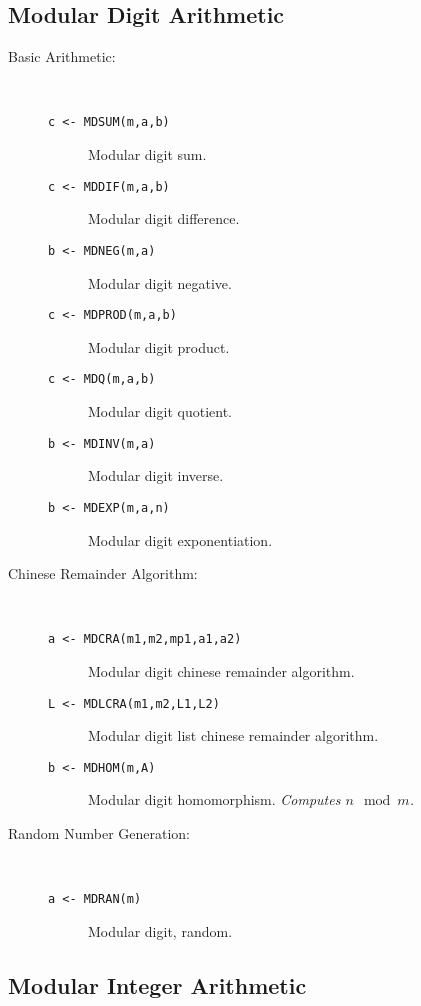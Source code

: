 \subsection{Modular Digit Arithmetic}

\begin{description}
\item[Basic Arithmetic:] \ \
  \begin{description}
  \item[{\tt  c <- MDSUM(m,a,b) 
}]  Modular digit sum.
  \item[{\tt  c <- MDDIF(m,a,b) 
}]  Modular digit difference.
  \item[{\tt  b <- MDNEG(m,a) 
}]  Modular digit negative.
  \item[{\tt c <- MDPROD(m,a,b) 
}]  Modular digit product.
  \item[{\tt c <- MDQ(m,a,b) 
}]  Modular digit quotient.
  \item[{\tt b <- MDINV(m,a) 
}]  Modular digit inverse.
  \item[{\tt b <- MDEXP(m,a,n) 
}]  Modular digit exponentiation.
  \end{description}

\item[Chinese Remainder Algorithm:] \ \
  \begin{description}
  \item[{\tt a <- MDCRA(m1,m2,mp1,a1,a2) 
}]  Modular digit chinese remainder algorithm.
  \item[{\tt L <- MDLCRA(m1,m2,L1,L2) 
}]\index{MDLCRA}  Modular digit list chinese remainder algorithm.
  \item[{\tt b <- MDHOM(m,A) 
}]\index{MDHOM}  Modular digit homomorphism. {\em Computes $n \mod m$.}
  \end{description}

\item[Random Number Generation:] \ \
  \begin{description}
  \item[{\tt a <- MDRAN(m) 
}]\index{MDRAN}  Modular digit, random.
  \end{description}

\end{description}


\subsection{Modular Integer Arithmetic}

